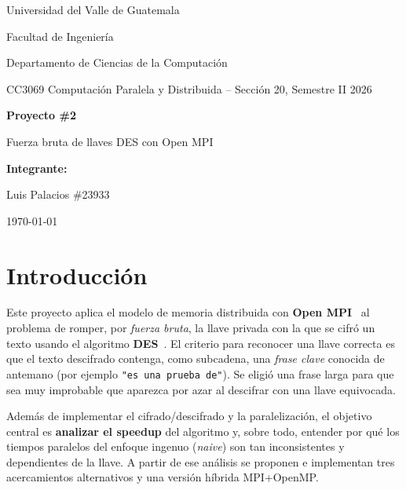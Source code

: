 \documentclass[11pt]{article}
\begin{document}
\begin{titlepage}
\centering
\vspace*{1.5cm}
{\large Universidad del Valle de Guatemala\par}
{\large Facultad de Ingeniería\par}
{\large Departamento de Ciencias de la Computación\par}
{\large CC3069 Computación Paralela y Distribuida -- Sección 20, Semestre II 2026\par}
\vspace{2.5cm}
{\Huge\bfseries Proyecto \#2\par}
\vspace{0.6cm}
{\LARGE Fuerza bruta de llaves DES con Open MPI\par}
\vspace{2.5cm}
{\large\bfseries Integrante:\par}
\vspace{0.3cm}
{\large Luis Palacios \#23933\par}
\vfill
{\large \today\par}
\end{titlepage}

\tableofcontents
\newpage

\section{Introducción}
Este proyecto aplica el modelo de memoria distribuida con \textbf{Open MPI}~\cite{mpi40,pacheco2011}
al problema de romper, por \emph{fuerza bruta}, la llave privada con la que se cifró un texto usando
el algoritmo \textbf{DES}~\cite{fips463,stallings2017}. El criterio para reconocer una llave correcta
es que el texto descifrado contenga, como subcadena, una \emph{frase clave} conocida de antemano
(por ejemplo \texttt{"es una prueba de"}). Se eligió una frase larga para que sea muy improbable que
aparezca por azar al descifrar con una llave equivocada.

Además de implementar el cifrado/descifrado y la paralelización, el objetivo central es
\textbf{analizar el speedup} del algoritmo y, sobre todo, entender por qué los tiempos paralelos del
enfoque ingenuo (\emph{naive}) son tan inconsistentes y dependientes de la llave. A partir de ese
análisis se proponen e implementan tres acercamientos alternativos y una versión híbrida MPI+OpenMP.
\end{document}
